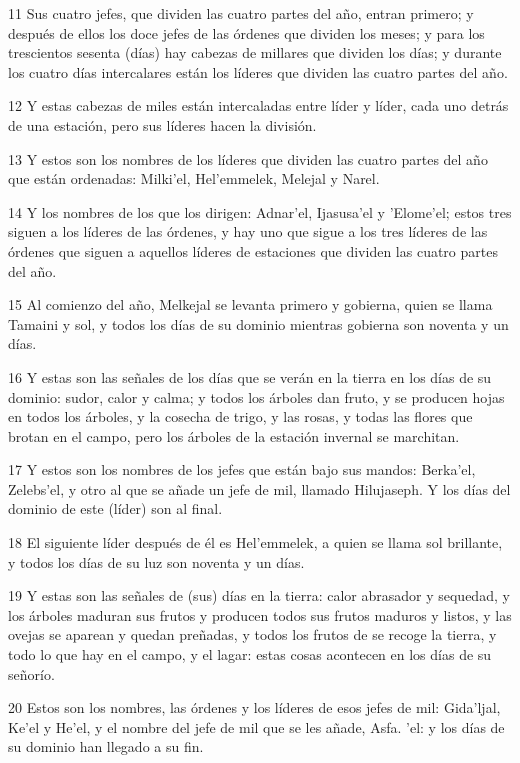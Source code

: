 \par 11 Sus cuatro jefes, que dividen las cuatro partes del año, entran primero; y después de ellos los doce jefes de las órdenes que dividen los meses; y para los trescientos sesenta (días) hay cabezas de millares que dividen los días; y durante los cuatro días intercalares están los líderes que dividen las cuatro partes del año.
\par 12 Y estas cabezas de miles están intercaladas entre líder y líder, cada uno detrás de una estación, pero sus líderes hacen la división.
\par 13 Y estos son los nombres de los líderes que dividen las cuatro partes del año que están ordenadas: Milki'el, Hel'emmelek, Melejal y Narel.
\par 14 Y los nombres de los que los dirigen: Adnar'el, Ijasusa'el y 'Elome'el; estos tres siguen a los líderes de las órdenes, y hay uno que sigue a los tres líderes de las órdenes que siguen a aquellos líderes de estaciones que dividen las cuatro partes del año.
\par 15 Al comienzo del año, Melkejal se levanta primero y gobierna, quien se llama Tamaini y sol, y todos los días de su dominio mientras gobierna son noventa y un días.
\par 16 Y estas son las señales de los días que se verán en la tierra en los días de su dominio: sudor, calor y calma; y todos los árboles dan fruto, y se producen hojas en todos los árboles, y la cosecha de trigo, y las rosas, y todas las flores que brotan en el campo, pero los árboles de la estación invernal se marchitan.
\par 17 Y estos son los nombres de los jefes que están bajo sus mandos: Berka'el, Zelebs'el, y otro al que se añade un jefe de mil, llamado Hilujaseph. Y los días del dominio de este (líder) son al final.
\par 18 El siguiente líder después de él es Hel'emmelek, a quien se llama sol brillante, y todos los días de su luz son noventa y un días.
\par 19 Y estas son las señales de (sus) días en la tierra: calor abrasador y sequedad, y los árboles maduran sus frutos y producen todos sus frutos maduros y listos, y las ovejas se aparean y quedan preñadas, y todos los frutos de se recoge la tierra, y todo lo que hay en el campo, y el lagar: estas cosas acontecen en los días de su señorío.
\par 20 Estos son los nombres, las órdenes y los líderes de esos jefes de mil: Gida'ljal, Ke'el y He'el, y el nombre del jefe de mil que se les añade, Asfa. 'el: y los días de su dominio han llegado a su fin.

